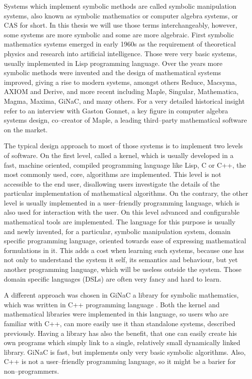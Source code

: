 Systems which implement symbolic methods are called symbolic manipulation systems, also known
as symbolic mathematics or computer algebra systems, or CAS for short. In this thesis we will
use those terms interchangeably, however, some systems are more symbolic and some are more
algebraic. First symbolic mathematics systems emerged in early 1960s as the requirement of
theoretical physics and research into artificial intelligence. Those were very basic systems,
usually implemented in Lisp programming language. Over the years more symbolic methods were
invented and the design of mathematical systems improved, giving a rise to modern systems,
amongst others Reduce, Macsyma, AXIOM and Derive, and more recent including Maple, Singular,
Mathematica, Magma, Maxima, GiNaC, and many others. For a very detailed historical insight
refer to an interview \cite{Haigh2005interview} with Gaston Gonnet, a key figure in computer
algebra systems design, co--creator of Maple, a leading third--party mathematical software
on the market.

The typical design approach to most of those systems is to implement two levels of software.
On the first level, called a kernel, which is usually developed in a fast, machine oriented,
compiled programming language like Lisp, C or C++, the most commonly used, core, algorithms
are implemented. This level is not accessible to the end user, disallowing users investigate
the details of the particular implementation of mathematical algorithms. On the contrary, the
other level is usually implemented in a user--friendly programming language, which is also
used for interaction with the user. On this level advanced and configurable mathematical tools
are implemented. The language for this purpose is usually and newly invented, for a particular,
symbolic manipulation system, domain specific programming language, oriented towards ease of
expressing mathematical formulations in it. This adds a cost when learning such systems, because
one has not only to understand the system it self, its semantics and behaviour, but yet another
programming language, which will be useless outside the system. Those domain specific languages
(DSLs) are often very fancy and hard to learn.

A different approach was chosen in GiNaC a library for symbolic mathematics, which was written
in C++ programming language \cite{Frink2001large}. Both the kernel and mathematical libraries were
implemented in this language, so users who are familiar with C++, can more easily use it than
standalone systems, described previously. Having a library has also the benefit, that one can
easily create his own programs which simply link to a single, relatively small dynamically
linked library. GiNaC is fast, but implements only very basic symbolic algorithms. Also, C++
is not a user--friendly programming language, so it might be a barier for non--programmers.

